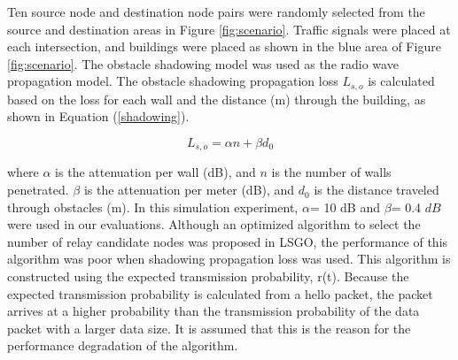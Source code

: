 \documentclass[conference]{IEEEtran}
\begin{document}
Ten source node and destination node pairs were randomly selected from the source and destination areas in Figure \ref{fig:scenario}.
 Traffic signals were placed at each intersection, and buildings were placed as shown in the blue area of Figure \ref{fig:scenario}. 
The obstacle shadowing model \cite{20} was used as the radio wave propagation model. The obstacle shadowing propagation loss $L_{s,o}$ is calculated based on the loss for each wall and the distance (m) through the building, as shown in Equation (\ref{shadowing}).

\begin{equation}
\label{shadowing}
L_{s,o} = \alpha n  + \beta d_0
\end{equation}

where $\alpha$ is the attenuation per wall (dB), and $n$ is the number of walls penetrated. 
$\beta$ is the attenuation per meter (dB), and $d_0$ is the distance traveled through obstacles (m). 
In this simulation experiment, $\alpha$= 10 dB and $\beta$= 0.4 $ dB $ were used in our evaluations. 
Although an optimized algorithm to select the number of relay candidate nodes was proposed in LSGO, the performance of this algorithm was poor when shadowing propagation loss was used. 
This algorithm is constructed using the expected transmission probability, r(t). Because the expected transmission probability is calculated from a hello packet, the packet arrives at a higher probability than the transmission probability of the data packet with a larger data size. It is assumed that this is the reason for the performance degradation of the algorithm. 
\end{document}
